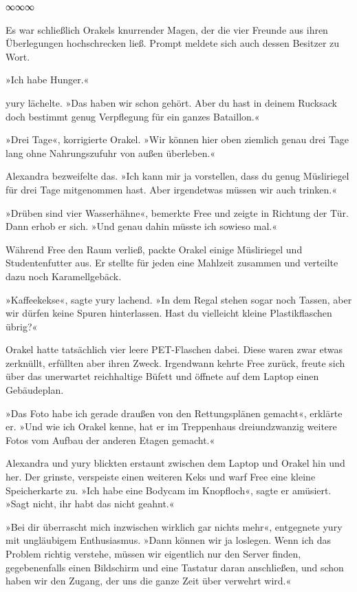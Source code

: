\begin{center}
	∞∞∞
\end{center}

Es war schließlich Orakels knurrender Magen, der die vier Freunde aus ihren Überlegungen hochschrecken ließ. Prompt meldete sich auch dessen Besitzer zu Wort.

»Ich habe Hunger.«

yury lächelte. »Das haben wir schon gehört. Aber du hast in deinem Rucksack doch bestimmt genug Verpflegung für ein ganzes Bataillon.«

»Drei Tage«, korrigierte Orakel. »Wir können hier oben ziemlich genau drei Tage lang ohne Nahrungszufuhr von außen überleben.«

Alexandra bezweifelte das. »Ich kann mir ja vorstellen, dass du genug Müsliriegel für drei Tage mitgenommen hast. Aber irgendetwas müssen wir auch trinken.«

»Drüben sind vier Wasserhähne«, bemerkte Free und zeigte in Richtung der Tür. Dann erhob er sich. »Und genau dahin müsste ich sowieso mal.«

Während Free den Raum verließ, packte Orakel einige Müsliriegel und Studentenfutter aus. Er stellte für jeden eine Mahlzeit zusammen und verteilte dazu noch Karamellgebäck.

»Kaffeekekse«, sagte yury lachend. »In dem Regal stehen sogar noch Tassen, aber wir dürfen keine Spuren hinterlassen. Hast du vielleicht kleine Plastikflaschen übrig?«

Orakel hatte tatsächlich vier leere PET-Flaschen dabei. Diese waren zwar etwas zerknüllt, erfüllten aber ihren Zweck. Irgendwann kehrte Free zurück, freute sich über das unerwartet reichhaltige Büfett und öffnete auf dem Laptop einen Gebäudeplan.

»Das Foto habe ich gerade draußen von den Rettungsplänen gemacht«, erklärte er. »Und wie ich Orakel kenne, hat er im Treppenhaus dreiundzwanzig weitere Fotos vom Aufbau der anderen Etagen gemacht.«

Alexandra und yury blickten erstaunt zwischen dem Laptop und Orakel hin und her. Der grinste, verspeiste einen weiteren Keks und warf Free eine kleine Speicherkarte zu. »Ich habe eine Bodycam im Knopfloch«, sagte er amüsiert. »Sagt nicht, ihr habt das nicht geahnt.«

»Bei dir überrascht mich inzwischen wirklich gar nichts mehr«, entgegnete yury mit ungläubigem Enthusiasmus. »Dann können wir ja loslegen. Wenn ich das Problem richtig verstehe, müssen wir eigentlich nur den Server finden, gegebenenfalls einen Bildschirm und eine Tastatur daran anschließen, und schon haben wir den Zugang, der uns die ganze Zeit über verwehrt wird.«

